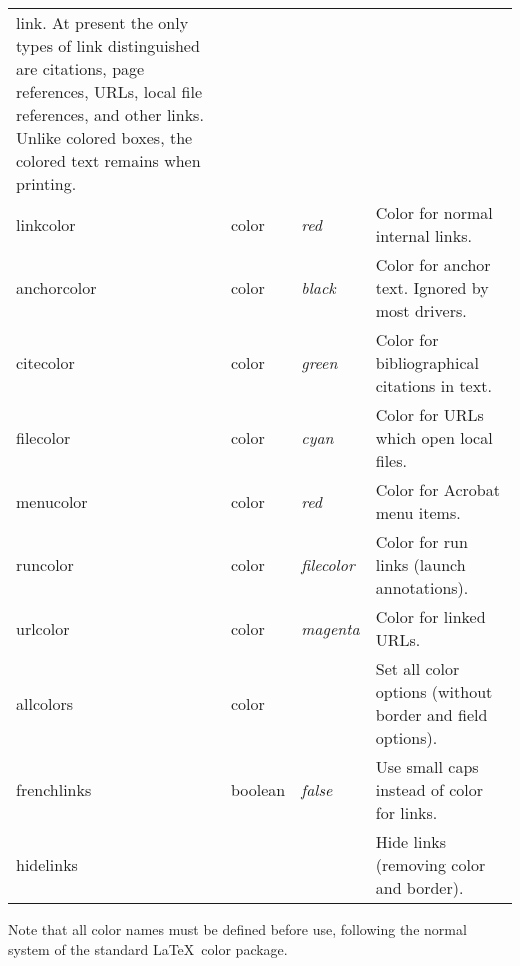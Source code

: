 \documentclass[pdftex]{article}
\newcommand*{\xpackage}[1]{\textsf{#1}}
\begin{document}
\begin{longtable}{@{}>{\ttfamily}ll>{\itshape}lp{5.5cm}@{}}
                                     link. At present the only types of link distinguished are citations, page references,
                                     URLs, local file references, and other links.
                                     Unlike colored boxes, the colored
                                     text remains when printing.\\
linkcolor      & color   & red     & Color for normal internal links. \\
anchorcolor    & color   & black   & Color for anchor text. Ignored by most drivers. \\
citecolor      & color   & green   & Color for bibliographical citations in text. \\
filecolor      & color   & cyan    & Color for URLs which open local files. \\
menucolor      & color   & red     & Color for Acrobat menu items. \\
runcolor       & color   & filecolor & Color for run links (launch annotations). \\
urlcolor       & color   & magenta & Color for linked URLs. \\
allcolors      & color   &         & Set all color options (without border and field options).\\
frenchlinks    & boolean & false   & Use small caps instead of color for links.\\
hidelinks      &         &         & Hide links (removing color and border). \\
\end{longtable} \smallskip

Note that all color names must be defined before use, following the
normal system of the standard \LaTeX\ \xpackage{color} package.
\end{document}
